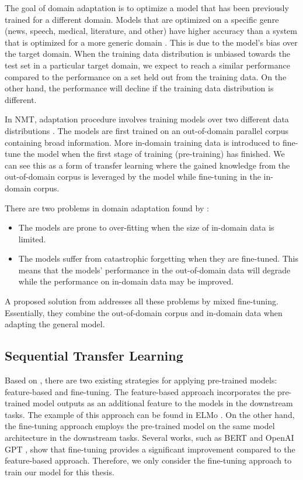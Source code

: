 The goal of domain adaptation is to optimize a model that has been previously trained for a different domain. Models that are optimized on a specific genre (news, speech, medical, literature, and other) have higher accuracy than a system that is optimized for a more generic domain . This is due to the model's bias over the target domain. When the training data distribution is unbiased towards the test set in a particular target domain, we expect to reach a similar performance compared to the performance on a set held out from the training data. On the other hand, the performance will decline if the training data distribution is different.

In NMT, adaptation procedure involves training models over two different data distributions . The models are first trained on an out-of-domain parallel corpus containing broad information. More in-domain training data is introduced to fine-tune the model when the first stage of training (pre-training) has finished. We can see this as a form of transfer learning where the gained knowledge from the out-of-domain corpus is leveraged by the model while fine-tuning in the in-domain corpus.

There are two problems in domain adaptation found by :
\begin{itemize}
    \item The models are prone to over-fitting when the size of in-domain data is limited.
    \item The models suffer from catastrophic forgetting when they are fine-tuned. This means that the models' performance in the out-of-domain data will degrade while the performance on in-domain data may be improved.
\end{itemize}
A proposed solution from  addresses all these problems by mixed fine-tuning. Essentially, they combine the out-of-domain corpus and in-domain data when adapting the general model.

\subsection{Sequential Transfer Learning}
Based on , there are two existing strategies for applying pre-trained models: feature-based and fine-tuning. The feature-based approach incorporates the pre-trained model outputs as an additional feature to the models in the downstream tasks. The example of this approach can be found in ELMo . On the other hand, the fine-tuning approach employs the pre-trained model on the same model architecture in the downstream tasks. Several works, such as BERT  and OpenAI GPT , show that fine-tuning provides a significant improvement compared to the feature-based approach. Therefore, we only consider the fine-tuning approach to train our model for this thesis.

